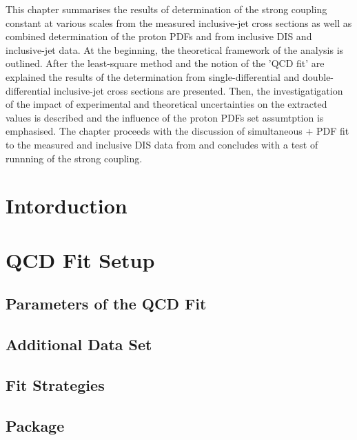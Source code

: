 This chapter summarises the results of determination of the strong coupling constant at various scales from the measured inclusive-jet cross sections as well as combined determination of the proton PDFs and \asz from inclusive DIS and inclusive-jet data. At the beginning, the theoretical framework of the analysis is outlined. After the least-square method and the notion of the 'QCD fit' are explained the results of the \asz determination from single-differential and double-differential inclusive-jet cross sections are presented. Then, the investigatigation of the impact of experimental and theoretical uncertainties on the extracted \asz values is described and the influence of the proton PDFs set assumtption is emphasised. The chapter proceeds with the discussion of simultaneous \as + PDF fit to the measured and inclusive DIS data from \hera and concludes with a test of runnning of the strong coupling.

\section{Intorduction}
\label{sec:qcdfitintro}


\section{QCD Fit Setup}
\label{sec:fitsettings}


\subsection{Parameters of the QCD Fit}
\label{subsec:qcdfitparams}


\subsection{Additional Data Set}
\label{subsec:inclusivedisdata}


\subsection{Fit Strategies}
\label{subsec:fitstategy}


\subsection{\herafitter Package}
\label{subsec:herfitter}


